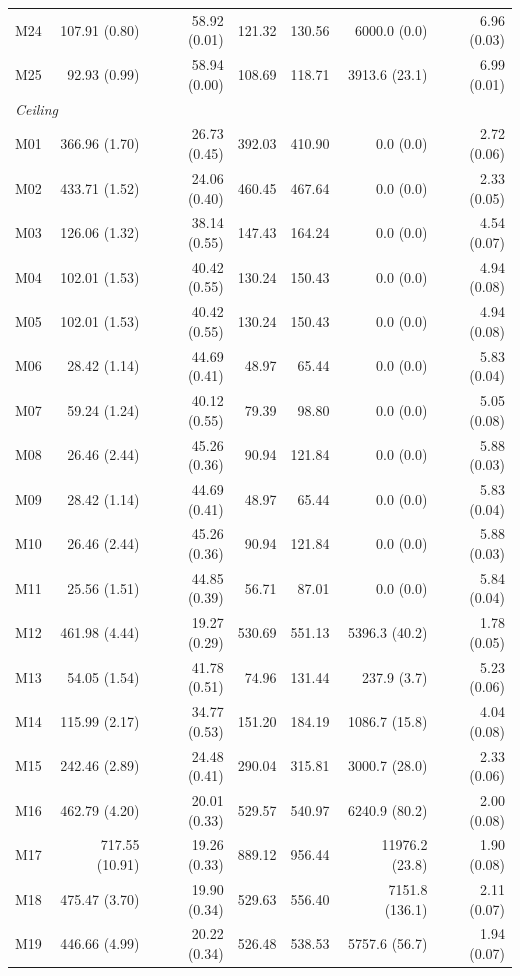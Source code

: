 \documentclass[11pt]{article}
\theoremstyle{remark}
\begin{document}
\begin{longtable}{lrrrrrr}
M24 & 107.91 (0.80) & 58.92 (0.01) & 121.32 & 130.56 & 6000.0 (0.0) & 6.96 (0.03) \\
M25 & 92.93 (0.99) & 58.94 (0.00) & 108.69 & 118.71 & 3913.6 (23.1) & 6.99 (0.01) \\
\multicolumn{7}{l}{\textit{Ceiling}} \\
M01 & 366.96 (1.70) & 26.73 (0.45) & 392.03 & 410.90 & 0.0 (0.0) & 2.72 (0.06) \\
M02 & 433.71 (1.52) & 24.06 (0.40) & 460.45 & 467.64 & 0.0 (0.0) & 2.33 (0.05) \\
M03 & 126.06 (1.32) & 38.14 (0.55) & 147.43 & 164.24 & 0.0 (0.0) & 4.54 (0.07) \\
M04 & 102.01 (1.53) & 40.42 (0.55) & 130.24 & 150.43 & 0.0 (0.0) & 4.94 (0.08) \\
M05 & 102.01 (1.53) & 40.42 (0.55) & 130.24 & 150.43 & 0.0 (0.0) & 4.94 (0.08) \\
M06 & 28.42 (1.14) & 44.69 (0.41) & 48.97 & 65.44 & 0.0 (0.0) & 5.83 (0.04) \\
M07 & 59.24 (1.24) & 40.12 (0.55) & 79.39 & 98.80 & 0.0 (0.0) & 5.05 (0.08) \\
M08 & 26.46 (2.44) & 45.26 (0.36) & 90.94 & 121.84 & 0.0 (0.0) & 5.88 (0.03) \\
M09 & 28.42 (1.14) & 44.69 (0.41) & 48.97 & 65.44 & 0.0 (0.0) & 5.83 (0.04) \\
M10 & 26.46 (2.44) & 45.26 (0.36) & 90.94 & 121.84 & 0.0 (0.0) & 5.88 (0.03) \\
M11 & 25.56 (1.51) & 44.85 (0.39) & 56.71 & 87.01 & 0.0 (0.0) & 5.84 (0.04) \\
M12 & 461.98 (4.44) & 19.27 (0.29) & 530.69 & 551.13 & 5396.3 (40.2) & 1.78 (0.05) \\
M13 & 54.05 (1.54) & 41.78 (0.51) & 74.96 & 131.44 & 237.9 (3.7) & 5.23 (0.06) \\
M14 & 115.99 (2.17) & 34.77 (0.53) & 151.20 & 184.19 & 1086.7 (15.8) & 4.04 (0.08) \\
M15 & 242.46 (2.89) & 24.48 (0.41) & 290.04 & 315.81 & 3000.7 (28.0) & 2.33 (0.06) \\
M16 & 462.79 (4.20) & 20.01 (0.33) & 529.57 & 540.97 & 6240.9 (80.2) & 2.00 (0.08) \\
M17 & 717.55 (10.91) & 19.26 (0.33) & 889.12 & 956.44 & 11976.2 (23.8) & 1.90 (0.08) \\
M18 & 475.47 (3.70) & 19.90 (0.34) & 529.63 & 556.40 & 7151.8 (136.1) & 2.11 (0.07) \\
M19 & 446.66 (4.99) & 20.22 (0.34) & 526.48 & 538.53 & 5757.6 (56.7) & 1.94 (0.07) \\

\end{longtable}
\end{document}
